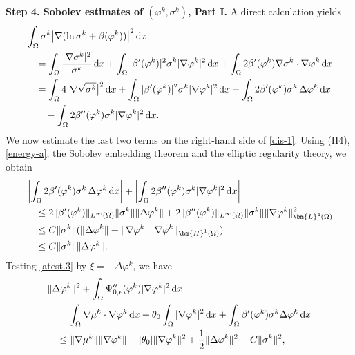 \documentclass[11pt,reqno]{amsart}
\def\d{{\rm d}}
\begin{document}
\textbf{Step 4. Sobolev estimates of $(\varphi^k,\sigma^k)$, Part I.}
A direct calculation yields
\begin{align}
&
\int_\Omega \sigma^k \big| \nabla (\ln \sigma^k +\beta(\varphi^k))\big|^2 \, \d x
\notag \\
&\quad =\int_\Omega \frac{|\nabla \sigma^k|^2}{\sigma^k} \, \d x
+ \int_\Omega |\beta'(\varphi^k)|^2 \sigma^k |\nabla \varphi^k|^2 \, \d x
+\int_\Omega 2 \beta'(\varphi^k) \nabla \sigma^k \cdot \nabla \varphi^k \, \d x
\notag \\
&\quad =\int_\Omega 4 \big|\nabla \sqrt{\sigma^k}\big|^2 \, \d x
+ \int_\Omega |\beta'(\varphi^k)|^2 \sigma^k |\nabla \varphi^k|^2 \, \d x
-\int_{\Omega} 2 \beta'(\varphi^k) \sigma^k \, \Delta \varphi^k \, \d x
\notag \\
&\qquad -\int_{\Omega} 2 \beta''(\varphi^k)  \sigma^k |\nabla  \varphi^k|^2 \, \d x.
\label{dis-1}
\end{align}
%
We now estimate the last two terms on the right-hand side of \eqref{dis-1}. Using (H4), \eqref{energy-a}, the Sobolev embedding theorem and the elliptic regularity theory, we obtain
%
\begin{align}
&\left|\int_{\Omega} 2 \beta'(\varphi^k) \sigma^k \, \Delta \varphi^k \, \d x \right| +
\left|\int_{\Omega} 2 \beta''(\varphi^k)  \sigma^k |\nabla  \varphi^k|^2 \, \d x \right|
\notag \\
&\quad \leq 2 \|\beta'(\varphi^k)\|_{L^\infty(\Omega)}\|\sigma^k\|\| \Delta \varphi^k\| + 2 \|\beta''(\varphi^k)\|_{L^\infty(\Omega)}  \|\sigma^k\| \|\nabla  \varphi^k\|_{\bm{L}^4(\Omega)}^2
\notag\\
&\quad \leq C\|\sigma^k\|(\| \Delta \varphi^k\| + \|\nabla  \varphi^k\| \|\nabla  \varphi^k\|_{\bm{H}^1(\Omega)})
\notag\\
&\quad \leq C\|\sigma^k\|\| \Delta \varphi^k\|.
\label{dis-1b}
\end{align}
%
Testing \eqref{atest.3} by $\xi=-\Delta \varphi^k$, we have
%
\begin{align}
&\| \Delta \varphi^k\|^2 + \int_{\Omega}\Psi_{0,\epsilon}''(\varphi^k)|\nabla \varphi^k|^2 \, \d x
\notag\\
& \quad =
\int_{\Omega} \nabla \mu^k \cdot \nabla \varphi^k \, \d x
+ \theta_0  \int_{\Omega} |\nabla \varphi^k|^2 \, \d x
 + \int_{\Omega} \beta'(\varphi^k)\sigma^k \Delta \varphi^k  \, \d x
\notag \\
&\quad \leq \|\nabla \mu^k\|\| \nabla \varphi^k\| + |\theta_0| \|\nabla \varphi^k\|^2 + \frac12 \|\Delta\varphi^k\|^2 + C \|\sigma^k\|^2,
\label{phi-H2-b}
\end{align}
\end{document}
